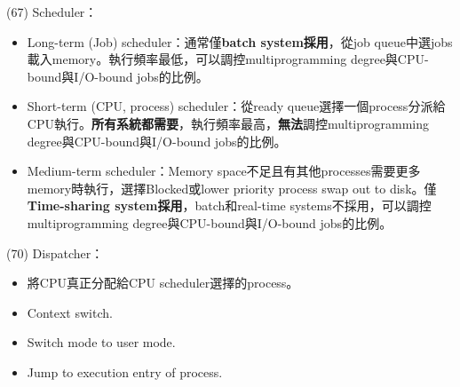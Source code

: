 \begin{theorem}{(67)} Scheduler：\begin{itemize}
        \item Long-term (Job) scheduler：通常僅\textbf{batch system採用}，從job queue中選jobs載入memory。執行頻率最低，可以調控multiprogramming degree與CPU-bound與I/O-bound jobs的比例。
        \item Short-term (CPU, process) scheduler：從ready queue選擇一個process分派給CPU執行。\textbf{所有系統都需要}，執行頻率最高，\textbf{無法}調控multiprogramming degree與CPU-bound與I/O-bound jobs的比例。
        \item Medium-term scheduler：Memory space不足且有其他processes需要更多memory時執行，選擇Blocked或lower priority process swap out to disk。僅\textbf{Time-sharing system採用}，batch和real-time systems不採用，可以調控multiprogramming degree與CPU-bound與I/O-bound jobs的比例。
    \end{itemize}
\end{theorem}

\begin{theorem}{(70)} Dispatcher： \begin{itemize}
        \item 將CPU真正分配給CPU scheduler選擇的process。
        \item Context switch.
        \item Switch mode to user mode.
        \item Jump to execution entry of process.
    \end{itemize}
\end{theorem}
